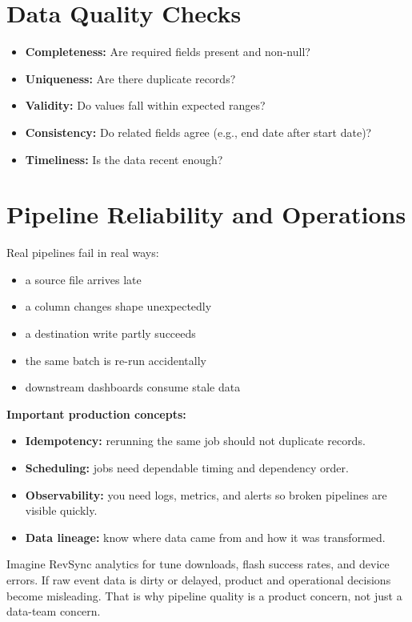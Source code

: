 \documentclass[12pt, a4paper, oneside]{book}
\begin{document}
\section{Data Quality Checks}

\begin{itemize}[leftmargin=2em]
    \item \textbf{Completeness:} Are required fields present and non-null?
    \item \textbf{Uniqueness:} Are there duplicate records?
    \item \textbf{Validity:} Do values fall within expected ranges?
    \item \textbf{Consistency:} Do related fields agree (e.g., end date after start date)?
    \item \textbf{Timeliness:} Is the data recent enough?
\end{itemize}

\section{Pipeline Reliability and Operations}

Real pipelines fail in real ways:
\begin{itemize}[leftmargin=2em]
    \item a source file arrives late
    \item a column changes shape unexpectedly
    \item a destination write partly succeeds
    \item the same batch is re-run accidentally
    \item downstream dashboards consume stale data
\end{itemize}

\textbf{Important production concepts:}
\begin{itemize}[leftmargin=2em]
    \item \textbf{Idempotency:} rerunning the same job should not duplicate records.
    \item \textbf{Scheduling:} jobs need dependable timing and dependency order.
    \item \textbf{Observability:} you need logs, metrics, and alerts so broken pipelines are visible quickly.
    \item \textbf{Data lineage:} know where data came from and how it was transformed.
\end{itemize}

\begin{projectbox}
Imagine RevSync analytics for tune downloads, flash success rates, and device errors. If raw event data is dirty or delayed, product and operational decisions become misleading. That is why pipeline quality is a product concern, not just a data-team concern.
\end{projectbox}
\end{document}
